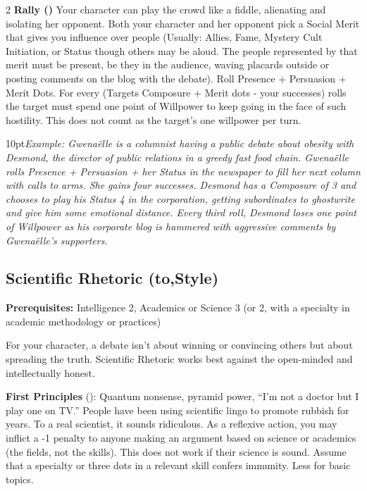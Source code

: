 \begin{multicols}{2}
\textbf{Rally (\textbullet\textbullet\textbullet\textbullet\textbullet)} Your character can play the crowd like a fiddle, alienating and isolating her opponent. Both your character and her opponent pick a Social Merit that gives you influence over people (Usually: Allies, Fame, Mystery Cult Initiation, or Status though others may be aloud. The people represented by that merit must be present, be they in the audience, waving placards outside or posting comments on the blog with the debate). Roll Presence + Persuasion + Merit Dots. For every (Targets Composure + Merit dots - your successes) rolls the target must spend one point of Willpower to keep going in the face of such hostility. This does not count as the target's one willpower per turn.

\begin{myindentpar}{10pt}\textit{Example: Gwena\"{e}lle is a columnist having a public debate about obesity with Desmond, the director of public relations in a greedy fast food chain. Gwena\"{e}lle rolls Presence + Persuasion + her Status in the newspaper to fill her next column with calls to arms. She gains four successes. Desmond has a Composure of 3 and chooses to play his Status 4 in the corporation, getting subordinates to ghostwrite and give him some emotional distance. Every third roll, Desmond loses one point of Willpower as his corporate blog is hammered with aggressive comments by Gwena\"{e}lle's supporters.}\end{myindentpar}

\subsection*{Scientific Rhetoric (\textbullet\nobreak\hspace{.16667em}to\nobreak\hspace{.16667em}\textbullet\textbullet\textbullet\textbullet\textbullet,\nobreak\hspace{.16667em}Style)}

\textbf{Prerequisites:} Intelligence 2, Academics or Science 3 (or 2, with a specialty in academic methodology or practices)

For your character, a debate isn't about winning or convincing others but about spreading the truth. Scientific Rhetoric works best against the open-minded and intellectually honest. 

\textbf{First Principles} (\textbullet): Quantum nonsense, pyramid power, “I'm not a doctor but I play one on TV.” People have been using scientific lingo to promote rubbish for years. To a real scientist, it sounds ridiculous. As a reflexive action, you may inflict a -1 penalty to anyone making an argument based on science or academics (the fields, not the skills). This does not work if their science is sound. Assume that a specialty or three dots in a relevant skill confers immunity. Less for basic topics.


\end{multicols}
